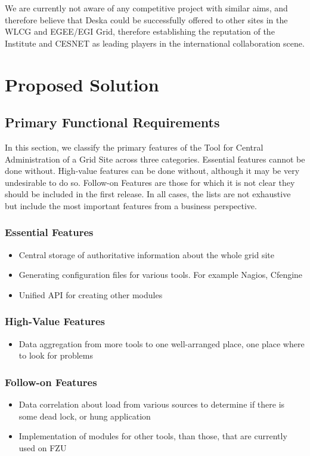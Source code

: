 \documentclass[12pt]{article}
\begin{document}
We are currently not aware of any competitive project with similar aims, and therefore believe that Deska could be successfully
offered to other sites in the WLCG and EGEE/EGI Grid, therefore establishing the reputation of the Institute and CESNET as leading
players in the international collaboration scene.

\section{Proposed Solution}

\subsection{Primary Functional Requirements}
In this section, we classify the primary features of the Tool for Central Administration of a Grid Site across three categories. 
Essential features cannot be done without. High-value features can be done without, although it may be very undesirable to do so. 
Follow-on Features are those for which it is not clear they should be included in the first release. In all cases, the lists are not 
exhaustive but include the most important features from a business perspective.

\subsubsection{Essential Features}
\begin{itemize}
	\item Central storage of authoritative information about the whole grid site
	\item Generating configuration files for various tools. For example Nagios, Cfengine
	\item Unified API for creating other modules
\end{itemize}

\subsubsection{High-Value Features}
\begin{itemize}
	\item Data aggregation from more tools to one well-arranged place, one place where to look for problems
\end{itemize}

\subsubsection{Follow-on Features}
\begin{itemize}
	\item Data correlation about load from various sources to determine if there is some dead lock, or hung application
	\item Implementation of modules for other tools, than those, that are currently used on FZU
\end{itemize}
\end{document}
